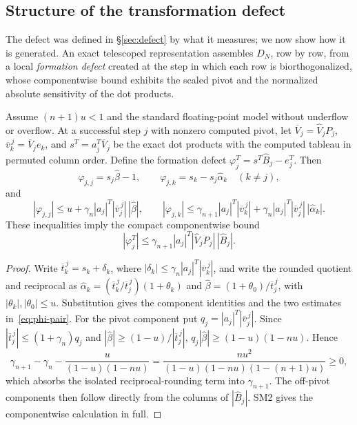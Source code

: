 \documentclass[review,onefignum,onetabnum]{siamart251216}
\begin{document}
\subsection{Structure of the transformation defect}
\label{sec:defect-structure}

The defect was defined in \S\ref{sec:defect} by what it measures; we now show how it is
generated. An exact telescoped representation assembles $D_N$, row by row, from a local
\emph{formation defect} created at the step in which each row is biorthogonalized, whose
componentwise bound exhibits the scaled pivot and the normalized absolute sensitivity of the dot
products.

\begin{proposition}\label{prop:local-defect}
Assume $(n+1)u<1$ and the standard floating-point model without underflow or overflow. At a
successful step $j$ with nonzero computed pivot, let
$\overline V_j=\widehat V_jP_j$, $\overline v_k^{\,j}=\overline V_je_k$, and
$s^T=a_j^T\overline V_j$ be the exact dot products with the computed tableau in permuted column
order. Define the formation defect $\varphi_j^T=s^T\widehat B_j-e_j^T$. Then
%
\begin{equation}\label{eq:phi-components}
\varphi_{j,j}=s_j\hat\beta-1,
\qquad
\varphi_{j,k}=s_k-s_j\hat\alpha_k \quad (k\ne j),
\end{equation}
%
and
%
\begin{equation}\label{eq:phi-pair}
|\varphi_{j,j}|
\le u+\gamma_n|a_j|^T|\overline v_j^{\,j}|\,|\hat\beta|,
\qquad
|\varphi_{j,k}|
\le \gamma_{n+1}|a_j|^T|\overline v_k^{\,j}|
+\gamma_n|a_j|^T|\overline v_j^{\,j}|\,|\hat\alpha_k|.
\end{equation}
%
These inequalities imply the compact componentwise bound
%
\begin{equation}\label{eq:phi-compact}
|\varphi_j^T|
\le
\gamma_{n+1}|a_j|^T|\widehat V_jP_j|\,|\widehat B_j|.
\end{equation}
\end{proposition}

\begin{proof}
Write $\overline t_k^{\,j}=s_k+\delta_k$, where
$|\delta_k|\le\gamma_n|a_j|^T|\overline v_k^{\,j}|$, and write the rounded quotient and reciprocal
as
$\hat\alpha_k=(\overline t_k^{\,j}/\overline t_j^{\,j})(1+\theta_k)$ and
$\hat\beta=(1+\theta_0)/\overline t_j^{\,j}$, with
$|\theta_k|,|\theta_0|\le u$.  Substitution gives the component identities and the two estimates
in~\eqref{eq:phi-pair}.  For the pivot component put
$q_j=|a_j|^T|\overline v_j^{\,j}|$.  Since
$|\overline t_j^{\,j}|\le(1+\gamma_n)q_j$ and
$|\hat\beta|\ge(1-u)/|\overline t_j^{\,j}|$,
$q_j|\hat\beta|\ge(1-u)(1-nu)$.  Hence
\[
\gamma_{n+1}-\gamma_n-
\frac{u}{(1-u)(1-nu)}
=
\frac{nu^2}{(1-u)(1-nu)(1-(n+1)u)}\ge0,
\]
which absorbs the isolated reciprocal-rounding term into $\gamma_{n+1}$.  The off-pivot
components then follow directly from the columns of $|\widehat B_j|$.  SM2 gives the componentwise
calculation in full.
\end{proof}
\end{document}
